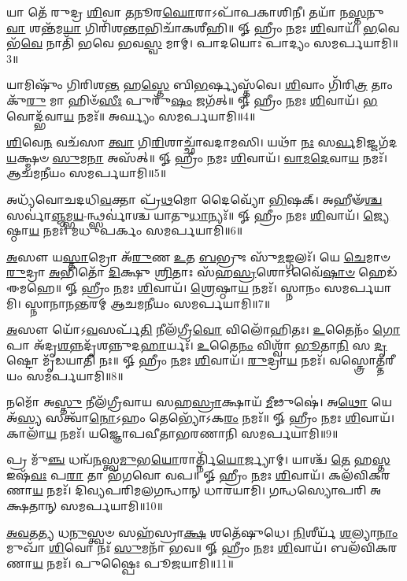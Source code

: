 𑌯𑌾 𑌤𑍇᳴ 𑌰𑍁𑌦𑍍𑌰 \ul{𑌶𑌿}\-𑌵𑌾 \ul{𑌤}\-𑌨𑍂𑌰\-\ul{𑌘𑍋}\-𑌰𑌾𑌽𑌪𑌾᳴𑌪𑌕𑌾𑌶𑌿𑌨𑍀। 𑌤𑌯𑌾᳴ 𑌨\-\ul{𑌸𑍍𑌤}\-𑌨𑍁\-\ul{𑌵𑌾} 𑌶𑌨𑍍𑌤᳴𑌮\-\ul{𑌯𑌾} 𑌗𑌿𑌰𑌿᳴𑌶\-\ul{𑌨𑍍𑌤𑌾}\-\-𑌭𑌿𑌚𑌾᳴𑌕𑌶𑍀𑌹𑌿॥ 𑍐 𑌹𑍍𑌰𑍀𑌂 \ul{𑌨}\-𑌮𑌃 \ul{𑌶𑌿}\-𑌵𑌾𑌯᳴। \ul{𑌭}\-𑌵𑍇 𑌭᳴\-\ul{𑌵𑍇} 𑌨𑌾𑌤𑌿᳴ 𑌭𑌵𑍇 𑌭𑌵\-\ul{𑌸𑍍𑌵} 𑌮𑌾𑌮𑍍। 𑌪𑌾𑌦𑌯𑍋𑌃 𑌪𑌾𑌦𑍍𑌯𑌂 𑌸𑌮𑌰𑍍𑌪𑌯𑌾𑌮𑌿॥3॥

𑌯𑌾𑌮𑌿𑌷𑍁𑌂᳴ 𑌗𑌿𑌰𑌿𑌶\-\ul{𑌨𑍍𑌤} 𑌹\-\ul{𑌸𑍍𑌤𑍇} 𑌬𑌿\-\ul{𑌭}\-𑌰𑍍𑌷𑍍𑌯𑌸𑍍𑌤᳴𑌵𑍇। \ul{𑌶𑌿}\-𑌵𑌾𑌂 𑌗𑌿᳴𑌰𑌿\-\ul{𑌤𑍍𑌰} 𑌤𑌾𑌂 𑌕𑍁᳴\-\ul{𑌰𑍁} 𑌮𑌾 𑌹𑌿𑍞᳴\-\ul{𑌸𑍀𑌃} 𑌪𑍁𑌰𑍁᳴\-\ul{𑌷𑌂} 𑌜𑌗᳴𑌤𑍍॥ 𑍐 𑌹𑍍𑌰𑍀𑌂 \ul{𑌨}\-𑌮𑌃 \ul{𑌶𑌿}\-𑌵𑌾𑌯᳴। \ul{𑌭}\-𑌵𑍋𑌦𑍍𑌭᳴𑌵𑌾\-\ul{𑌯} 𑌨𑌮𑌃᳴॥ 𑌅𑌰𑍍𑌘𑍍𑌯𑌂 𑌸𑌮𑌰𑍍𑌪𑌯𑌾𑌮𑌿॥4॥

\-\ul{𑌶𑌿}\-𑌵𑍇\-\ul{𑌨} 𑌵𑌚᳴𑌸𑌾 \ul{𑌤𑍍𑌵𑌾} 𑌗𑌿\-\ul{𑌰𑌿}\-𑌶𑌾𑌚𑍍𑌛𑌾᳴𑌵𑌦𑌾𑌮𑌸𑌿। 𑌯𑌥𑌾᳴ \ul{𑌨𑌃} 𑌸\-\ul{𑌰𑍍𑌵}\-𑌮𑌿𑌜𑍍𑌜𑌗᳴𑌦\-\ul{𑌯}\-𑌕𑍍𑌷𑍍𑌮𑍞 \ul{𑌸𑍁}\-𑌮\-\ul{𑌨𑌾} 𑌅𑌸᳴𑌤𑍍॥ 𑍐 𑌹𑍍𑌰𑍀𑌂 \ul{𑌨}\-𑌮𑌃 \ul{𑌶𑌿}\-𑌵𑌾𑌯᳴। \ul{𑌵𑌾}\-\-\ul{𑌮}\-\-\ul{𑌦𑍇}\-𑌵𑌾\-\ul{𑌯} 𑌨𑌮𑌃᳴। 𑌆𑌚𑌮𑌨𑍀𑌯𑌂 𑌸𑌮𑌰𑍍𑌪𑌯𑌾𑌮𑌿॥5॥

𑌅𑌧𑍍𑌯᳴𑌵𑍋𑌚𑌦𑌧𑌿\-\ul{𑌵}\-𑌕𑍍𑌤𑌾 𑌪𑍍𑌰᳴\-\ul{𑌥}\-𑌮𑍋 𑌦𑍈𑌵𑍍𑌯𑍋᳴ \ul{𑌭𑌿}\-𑌷𑌕𑍍। 𑌅𑌹𑍀𑍟᳴\-\ul{𑌶𑍍𑌚} 𑌸𑌰𑍍𑌵𑌾॑\-\ul{𑌞𑍍𑌜}\-𑌮𑍍𑌭\-\ul{𑌯}\--𑌨𑍍𑌥𑍍𑌸𑌰𑍍𑌵𑌾॑𑌶𑍍𑌚 𑌯𑌾𑌤𑍁\-\ul{𑌧𑌾}\-𑌨𑍍𑌯𑌃᳴॥ 𑍐 𑌹𑍍𑌰𑍀𑌂 \ul{𑌨}\-𑌮𑌃 \ul{𑌶𑌿}\-𑌵𑌾𑌯᳴। \ul{𑌜𑍍𑌯𑍇}\-𑌷𑍍𑌠𑌾\-\ul{𑌯} 𑌨𑌮𑌃᳴। 𑌮𑌧𑍁𑌪𑌰𑍍𑌕𑌂 𑌸𑌮𑌰𑍍𑌪𑌯𑌾𑌮𑌿॥6॥

\-\ul{𑌅}\-𑌸𑍗 𑌯\-\ul{𑌸𑍍𑌤𑌾}\-𑌮𑍍𑌰𑍋 𑌅᳴\-\ul{𑌰𑍁}\-𑌣 \ul{𑌉}\-𑌤 \ul{𑌬}\-𑌭𑍍𑌰𑍁𑌃 𑌸𑍁᳴\-\ul{𑌮}\-𑌙𑍍𑌗𑌲𑌃᳴। 𑌯𑍇 \ul{𑌚𑍇}\-𑌮𑌾𑍞 \ul{𑌰𑍁}\-𑌦𑍍𑌰𑌾 \ul{𑌅}\-𑌭𑌿𑌤𑍋᳴ \ul{𑌦𑌿}\-𑌕𑍍𑌷𑍁 \ul{𑌶𑍍𑌰𑌿}\-𑌤𑌾𑌃 𑌸᳴𑌹\-\ul{𑌸𑍍𑌰}\-𑌶𑍋𑌽𑌵𑍈᳴\-\ul{𑌷𑌾}\-\-\ul{𑍞} 𑌹𑍇𑌡᳴ 𑌈𑌮𑌹𑍇॥ 𑍐 𑌹𑍍𑌰𑍀𑌂 \ul{𑌨}\-𑌮𑌃 \ul{𑌶𑌿}\-𑌵𑌾𑌯᳴। \ul{𑌶𑍍𑌰𑍇}\-𑌷𑍍𑌠𑌾\-\ul{𑌯} 𑌨𑌮𑌃᳴। 𑌸𑍍𑌨𑌾𑌨𑌂 𑌸𑌮𑌰𑍍𑌪𑌯𑌾𑌮𑌿। 𑌸𑍍𑌨𑌾𑌨𑌾𑌨𑌨𑍍𑌤𑌰𑌮𑍍 𑌆𑌚𑌮𑌨𑍀𑌯𑌂 𑌸𑌮𑌰𑍍𑌪𑌯𑌾𑌮𑌿॥7॥

\-\ul{𑌅}\-𑌸𑍗 𑌯𑍋᳴𑌽\-\ul{𑌵}\-𑌸𑌰𑍍𑌪᳴\-\ul{𑌤𑌿} 𑌨𑍀𑌲᳴𑌗𑍍𑌰𑍀\-\ul{𑌵𑍋} 𑌵𑌿𑌲𑍋᳴𑌹𑌿𑌤𑌃। \ul{𑌉}\-𑌤𑍈𑌨𑌂᳴ \ul{𑌗𑍋}\-𑌪𑌾 𑌅᳴𑌦𑍃\-\ul{𑌶}\-\-\ul{𑌨𑍍𑌨}\-𑌦𑍃᳴𑌶𑌨𑍍𑌨𑍁𑌦\-\ul{𑌹𑌾}\-𑌰𑍍𑌯𑌃᳴। \ul{𑌉}\-𑌤𑍈\-\ul{𑌨𑌂} 𑌵𑌿𑌶𑍍𑌵𑌾᳴ \ul{𑌭𑍂}\-𑌤𑌾\-\ul{𑌨𑌿} 𑌸 \ul{𑌦𑍃}\-𑌷𑍍𑌟𑍋 𑌮𑍃᳴𑌡𑌯𑌾𑌤𑌿 𑌨𑌃॥ 𑍐 𑌹𑍍𑌰𑍀𑌂 \ul{𑌨}\-𑌮𑌃 \ul{𑌶𑌿}\-𑌵𑌾𑌯᳴। \ul{𑌰𑍁}\-𑌦𑍍𑌰𑌾\-\ul{𑌯} 𑌨𑌮𑌃᳴। 𑌵𑌸𑍍𑌤𑍍𑌰𑍋𑌤𑍍𑌤𑌰𑍀𑌯𑌂 𑌸𑌮𑌰𑍍𑌪𑌯𑌾𑌮𑌿॥8॥

𑌨𑌮𑍋᳴ 𑌅\-\ul{𑌸𑍍𑌤𑍁} 𑌨𑍀𑌲᳴𑌗𑍍𑌰𑍀𑌵𑌾𑌯 𑌸𑌹\-\ul{𑌸𑍍𑌰𑌾}\-𑌕𑍍𑌷𑌾𑌯᳴ \ul{𑌮𑍀}\-𑌢𑍁𑌷𑍇॑। 𑌅\-\ul{𑌥𑍋} 𑌯𑍇 𑌅᳴\-\ul{𑌸𑍍𑌯} 𑌸𑌤𑍍𑌵𑌾᳴\-\ul{𑌨𑍋}\-𑌽𑌹𑌂 𑌤𑍇𑌭𑍍𑌯𑍋᳴𑌽𑌕\-\ul{𑌰𑌂} 𑌨𑌮𑌃᳴॥ 𑍐 𑌹𑍍𑌰𑍀𑌂 \ul{𑌨}\-𑌮𑌃 \ul{𑌶𑌿}\-𑌵𑌾𑌯᳴। 𑌕𑌾𑌲𑌾᳴\-\ul{𑌯} 𑌨𑌮𑌃᳴। 𑌯𑌜𑍍𑌞𑍋𑌪𑌵𑍀𑌤𑌾𑌭𑌰𑌣𑌾𑌨𑌿 𑌸𑌮𑌰𑍍𑌪𑌯𑌾𑌮𑌿॥9॥

𑌪𑍍𑌰 𑌮𑍁᳴\-\ul{𑌞𑍍𑌚} 𑌧𑌨𑍍𑌵᳴\-\ul{𑌨}\-𑌸𑍍𑌤𑍍𑌵\-\ul{𑌮𑍁}\-𑌭\-\ul{𑌯𑍋}\-𑌰𑌾𑌰𑍍𑌤𑍍𑌨𑌿᳴\-\ul{𑌯𑍋}\-𑌰𑍍𑌜𑍍𑌯𑌾𑌮𑍍। 𑌯𑌾𑌶𑍍𑌚᳴ \ul{𑌤𑍇} 𑌹\-\ul{𑌸𑍍𑌤} 𑌇𑌷᳴\-\ul{𑌵𑌃} 𑌪\-\ul{𑌰𑌾} 𑌤𑌾 𑌭᳴𑌗𑌵𑍋 𑌵𑌪॥ 𑍐 𑌹𑍍𑌰𑍀𑌂 \ul{𑌨}\-𑌮𑌃 \ul{𑌶𑌿}\-𑌵𑌾𑌯᳴। 𑌕𑌲᳴𑌵𑌿𑌕𑌰𑌣𑌾\-\ul{𑌯} 𑌨𑌮𑌃᳴। 𑌦𑌿𑌵𑍍𑌯𑌪𑌰𑌿𑌮𑌲𑌗𑌨𑍍𑌧𑌾𑌨𑍍 𑌧𑌾𑌰𑌯𑌾𑌮𑌿। 𑌗𑌨𑍍𑌧𑌸𑍍𑌯𑍋𑌪𑌰𑌿 𑌅𑌕𑍍𑌷𑌤𑌾𑌨𑍍 𑌸𑌮𑌰𑍍𑌪𑌯𑌾𑌮𑌿॥10॥

\-\ul{𑌅}\-\-\ul{𑌵}\-𑌤\-\ul{𑌤𑍍𑌯} 𑌧\-\ul{𑌨𑍁}\-𑌸𑍍𑌤𑍍𑌵𑍞 𑌸𑌹᳴𑌸𑍍𑌰𑌾\-\ul{𑌕𑍍𑌷} 𑌶𑌤𑍇᳴𑌷𑍁𑌧𑍇। \ul{𑌨𑌿}\-𑌶𑍀𑌰𑍍𑌯᳴ \ul{𑌶}\-𑌲𑍍𑌯𑌾\-\ul{𑌨𑌾𑌂} 𑌮𑍁𑌖𑌾᳴ \ul{𑌶𑌿}\-𑌵𑍋 𑌨𑌃᳴ \ul{𑌸𑍁}\-𑌮𑌨𑌾᳴ 𑌭𑌵॥ 𑍐 𑌹𑍍𑌰𑍀𑌂 \ul{𑌨}\-𑌮𑌃 \ul{𑌶𑌿}\-𑌵𑌾𑌯᳴। 𑌬𑌲᳴𑌵𑌿𑌕𑌰𑌣𑌾\-\ul{𑌯} 𑌨𑌮𑌃᳴। 𑌪𑍁𑌷𑍍𑌪𑍈𑌃 𑌪𑍂𑌜𑌯𑌾𑌮𑌿॥11॥



